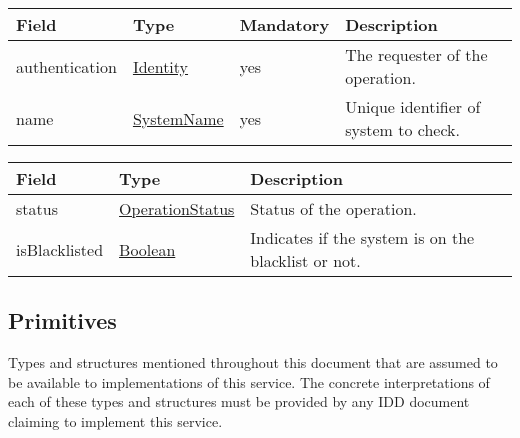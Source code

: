 \documentclass[a4paper]{arrowhead}
\newcommand{\pref}[1]{{\textcolor{ArrowheadGrey}{\hyperref[sec:model:primitives:#1]{#1}}}}
\begin{document}
 
\begin{table}[ht!]
\begin{tabularx}{\textwidth}{| p{3cm} | p{3cm} | p{2cm} | X |} \hline
\rowcolor{gray!33} Field & Type & Mandatory & Description \\ \hline
authentication & \hyperref[sec:model:Identity]{Identity} & yes & The requester of the operation. \\ \hline
name & \pref{SystemName} & yes & Unique identifier of system to check. \\ \hline
\end{tabularx}
\end{table}

 
\begin{table}[ht!]
\begin{tabularx}{\textwidth}{| p{3cm} | p{3cm} | X |} \hline
\rowcolor{gray!33} Field & Type      & Description \\ \hline
status & \pref{OperationStatus} & Status of the operation. \\ \hline
isBlacklisted & \pref{Boolean} & Indicates if the system is on the blacklist or not. \\ \hline
\end{tabularx}
\end{table}

\clearpage

\subsection{Primitives}
\label{sec:model:primitives}

Types and structures mentioned throughout this document that are assumed to be available to implementations of this service.
The concrete interpretations of each of these types and structures must be provided by any IDD document claiming to implement this service.
\end{document}

